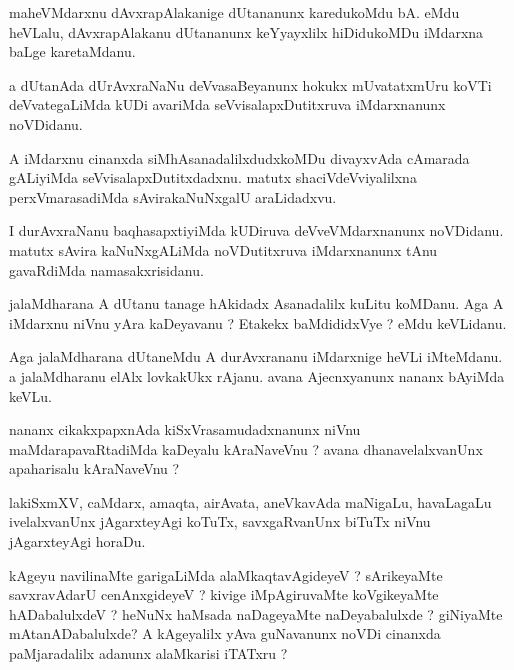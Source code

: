 \documentclass{article}
\begin{document}
\begin{mn}%
maheVMdarxnu dAvxrapAlakanige dUtananunx karedukoMdu bA. eMdu heVLalu, dAvxrapAlakanu 
dUtananunx keYyayxlilx hiDidukoMDu iMdarxna baLge karetaMdanu.
\end{mn}

\begin{mn}%
a dUtanAda dUrAvxraNaNu deVvasaBeyanunx hokukx mUvatatxmUru koVTi deVvategaLiMda kUDi 
avariMda seVvisalapxDutitxruva iMdarxnanunx noVDidanu.
\end{mn}

\begin{mn}%
A iMdarxnu cinanxda siMhAsanadalilxdudxkoMDu divayxvAda cAmarada gALiyiMda 
seVvisalapxDutitxdadxnu. matutx shaciVdeVviyalilxna perxVmarasadiMda sAvirakaNuNxgalU 
araLidadxvu.
\end{mn}

\begin{mn}%
I durAvxraNanu baqhasapxtiyiMda kUDiruva deVveVMdarxnanunx noVDidanu. matutx sAvira 
kaNuNxgALiMda noVDutitxruva iMdarxnanunx tAnu gavaRdiMda namasakxrisidanu.
\end{mn}

\begin{mn}%
jalaMdharana A dUtanu tanage hAkidadx Asanadalilx kuLitu koMDanu. Aga A iMdarxnu niVnu yAra 
kaDeyavanu ? Etakekx baMdididxVye ? eMdu keVLidanu.
\end{mn}

\begin{mn}%
Aga jalaMdharana dUtaneMdu A durAvxrananu iMdarxnige heVLi iMteMdanu. a jalaMdharanu elAlx 
lovkakUkx rAjanu. avana Ajecnxyanunx nananx bAyiMda keVLu.
\end{mn}

\begin{mn}%
nananx cikakxpapxnAda kiSxVrasamudadxnanunx niVnu maMdarapavaRtadiMda kaDeyalu kAraNaveVnu ? 
avana dhanavelalxvanUnx apaharisalu kAraNaveVnu ? 
\end{mn}

\begin{mn}%
lakiSxmXV, caMdarx, amaqta, airAvata, aneVkavAda maNigaLu, havaLagaLu ivelalxvanUnx 
jAgarxteyAgi koTuTx, savxgaRvanUnx biTuTx niVnu jAgarxteyAgi horaDu.
\end{mn}

\begin{mn}%
kAgeyu navilinaMte garigaLiMda alaMkaqtavAgideyeV ? sArikeyaMte savxravAdarU cenAnxgideyeV ? 
kivige iMpAgiruvaMte koVgikeyaMte hADabalulxdeV ? heNuNx haMsada naDageyaMte naDeyabalulxde 
? giNiyaMte mAtanADabalulxde? A kAgeyalilx yAva guNavanunx noVDi cinanxda paMjaradalilx 
adanunx alaMkarisi iTATxru ?
\end{mn}
\end{document}
